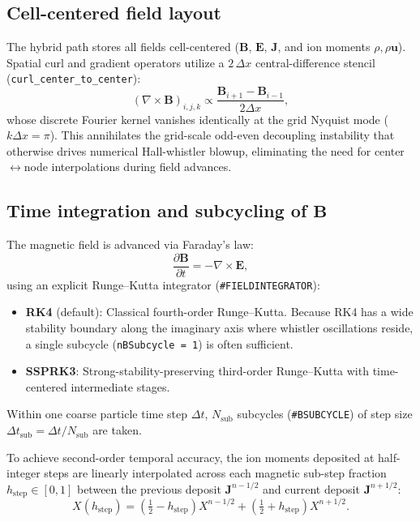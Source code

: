 \documentclass[a4paper, 11pt]{article}
\begin{document}
\subsection{Cell-centered field layout}

The hybrid path stores all fields cell-centered ($\mathbf{B}$, $\mathbf{E}$, $\mathbf{J}$, and ion moments $\rho, \rho\mathbf{u}$). Spatial curl and gradient operators utilize a $2\,\Delta x$ central-difference stencil (\texttt{curl\_center\_to\_center}):
\begin{equation}
(\nabla \times \mathbf{B})_{i,j,k} \propto \frac{\mathbf{B}_{i+1} - \mathbf{B}_{i-1}}{2\Delta x},
\end{equation}
whose discrete Fourier kernel vanishes identically at the grid Nyquist mode ($k\Delta x = \pi$). This annihilates the grid-scale odd-even decoupling instability that otherwise drives numerical Hall-whistler blowup, eliminating the need for center$\leftrightarrow$node interpolations during field advances.

\subsection{Time integration and subcycling of $\mathbf{B}$}

The magnetic field is advanced via Faraday's law:
\begin{equation}
\frac{\partial \mathbf{B}}{\partial t} = -\nabla\times\mathbf{E},
\end{equation}
using an explicit Runge--Kutta integrator (\texttt{\#FIELDINTEGRATOR}):
\begin{itemize}
  \item \textbf{RK4} (default): Classical fourth-order Runge--Kutta. Because RK4 has a wide stability boundary along the imaginary axis where whistler oscillations reside, a single subcycle (\texttt{nBSubcycle = 1}) is often sufficient.
  \item \textbf{SSPRK3}: Strong-stability-preserving third-order Runge--Kutta with time-centered intermediate stages.
\end{itemize}
Within one coarse particle time step $\Delta t$, $N_{\text{sub}}$ subcycles (\texttt{\#BSUBCYCLE}) of step size $\Delta t_{\text{sub}} = \Delta t / N_{\text{sub}}$ are taken.

To achieve second-order temporal accuracy, the ion moments deposited at half-integer steps are linearly interpolated across each magnetic sub-step fraction $h_{\text{step}} \in [0, 1]$ between the previous deposit $\mathbf{J}^{n-1/2}$ and current deposit $\mathbf{J}^{n+1/2}$:
\begin{equation}
X(h_{\text{step}}) = \left(\tfrac{1}{2}-h_{\text{step}}\right) X^{n-1/2} + \left(\tfrac{1}{2}+h_{\text{step}}\right) X^{n+1/2}.
\end{equation}
\end{document}
